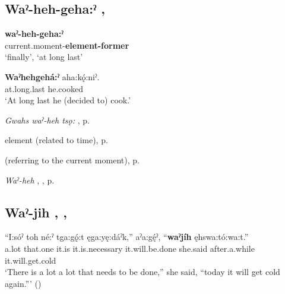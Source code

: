\subsection*{\textbf{Waˀ-heh-geha:ˀ} , } \label{p:[waˀ-heh-geha:ˀ]}

\ea
\label{ex:wpart8}
\gll \textbf{waˀ-heh-geha:ˀ}\\
current.moment-\textbf{element-former}\\
\glt ‘finally’, ‘at long last’
\z


\ea
\label{ex:wpart9}
\gll \textbf{Waˀhehgehá:ˀ} aha:kǫ́:niˀ.\\
at.long.last he.cooked\\
\glt ‘At long last he (decided to) cook.’
\z


\begin{CayugaRelated}
\item \textit{Gwahs waˀ-heh tsǫ:} , p. \pageref{p:[gwahs waˀ-heh tsǫ:]}\\
\item {} element (related to time), p. \pageref{p:[-heh]}\\
\item {} (referring to the current moment), p. \pageref{p:[waˀ-]}\\
\item \textit{Waˀ-heh} , , p. \pageref{p:[waˀ-heh]}
\end{CayugaRelated}




\subsection*{\textbf{Waˀ-jih} , , } \label{p:[waˀ-jih] ‘after a while’}

\ea
\label{ex:wpart10}
\gll “I:sóˀ toh né:ˀ tga:gǫ́:t ęga:yę:dáˀk,” aˀa:gę́ˀ, “\textbf{waˀjíh} ęhswa:tó:wa:t.”\\
a.lot that.one it.is it.is.necessary it.will.be.done she.said after.a.while it.will.get.cold\\
\glt ‘There is a lot a lot that needs to be done,” she said, “today it will get cold again.”’ (\cite{henry_de_2005})
\z



